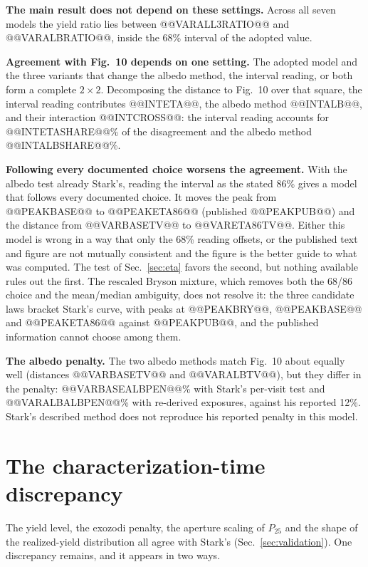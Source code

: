 \documentclass[11pt,a4paper]{article}
\begin{document}
\textbf{The main result does not depend on these settings.} Across all seven models the yield
ratio lies between @@VARALL3RATIO@@ and @@VARALBRATIO@@, inside the 68\% interval of the adopted
value.

\textbf{Agreement with Fig.~10 depends on one setting.} The adopted model and the three variants
that change the albedo method, the interval reading, or both form a complete $2\times2$.
Decomposing the distance to Fig.~10 over that square, the interval reading contributes
@@INTETA@@, the albedo method @@INTALB@@, and their interaction @@INTCROSS@@: the interval reading
accounts for @@INTETASHARE@@\% of the disagreement and the albedo method @@INTALBSHARE@@\%.

\textbf{Following every documented choice worsens the agreement.} With the albedo test already
Stark's, reading the interval as the stated 86\% gives a model that follows every documented
choice. It moves the peak from @@PEAKBASE@@ to @@PEAKETA86@@ (published @@PEAKPUB@@) and the
distance from @@VARBASETV@@ to @@VARETA86TV@@. Either this model is wrong in a way that only the
68\% reading offsets, or the published text and figure are not mutually consistent and the figure
is the better guide to what was computed. The test of Sec.~\ref{sec:eta} favors the second, but
nothing available rules out the first. The rescaled Bryson mixture, which removes both the 68/86
choice and the mean/median ambiguity, does not resolve it: the three candidate laws bracket Stark's
curve, with peaks at @@PEAKBRY@@, @@PEAKBASE@@ and @@PEAKETA86@@ against @@PEAKPUB@@, and the
published information cannot choose among them.

\textbf{The albedo penalty.} The two albedo methods match Fig.~10 about equally well
(distances @@VARBASETV@@ and @@VARALBTV@@), but they differ in the penalty: @@VARBASEALBPEN@@\% with Stark's per-visit test and
@@VARALBALBPEN@@\% with re-derived exposures, against his reported 12\%. Stark's described method
does not reproduce his reported penalty in this model.

\section{The characterization-time discrepancy}
\label{sec:open}

The yield level, the exozodi penalty, the aperture scaling of $P_{25}$ and the shape of the
realized-yield distribution all agree with Stark's (Sec.~\ref{sec:validation}). One discrepancy
remains, and it appears in two ways.
\end{document}

